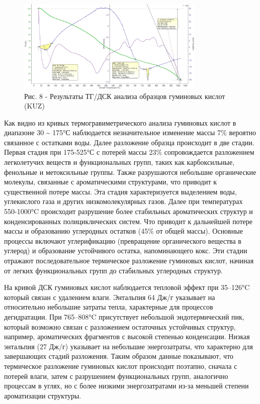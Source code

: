 \begin{figure}[H]
	\centering
	\includegraphics[width=0.8\textwidth]{media/gorn3/image19}
	\caption*{Рис. 8 - Результаты ТГ/ДСК анализа образцов гуминовых кислот (KUZ)}
\end{figure}

\begin{multicols}{2}
Как видно из кривых термогравиметрического анализа гуминовых кислот в
диапазоне 30 \textasciitilde{} 175°С наблюдается незначительное
изменение массы 7\% вероятно связанное с остатками воды. Далее
разложение образца происходит в две стадии. Первая стадия при 175-525°С
с потерей массы 23\% сопровождается разложением легколетучих веществ и
функциональных групп, таких как карбоксильные, фенольные и метоксильные
группы. Также разрушаются небольшие органические молекулы, связанные с
ароматическими структурами, что приводит к существенной потере массы.
Эта стадия характеризуется выделением воды, углекислого газа и других
низкомолекулярных газов. Далее при температурах 550-1000°C происходит
разрушение более стабильных ароматических структур и конденсированных
полициклических систем. Что приводит к дальнейшей потере массы и
образованию углеродных остатков (45\% от общей массы). Основные процессы
включают углерификацию (превращение органического вещества в углерод) и
образование устойчивого остатка, напоминающего кокс. Эти стадии отражают
последовательное термическое разложение гуминовых кислот, начиная от
легких функциональных групп до стабильных углеродных структур.

На кривой ДСК гуминовых кислот наблюдается тепловой эффект при 35--126°C
который связан с удалением влаги. Энтальпия 64 Дж/г указывает на
относительно небольшие затраты тепла, характерные для процессов
дегидратации. При 765--808°C присутствует небольшой эндотермический пик,
который возможно связан с разложением остаточных устойчивых структур,
например, ароматических фрагментов с высокой степенью конденсации.
Низкая энтальпия (27 Дж/г) указывает на небольшие энергозатраты, что
характерно для завершающих стадий разложения. Таким образом данные
показывают, что термическое разложение гуминовых кислот происходит
поэтапно, сначала с потерей влаги, затем с разрушением функциональных
групп, аналогично процессам в углях, но с более низкими энергозатратами
из-за меньшей степени ароматизации структуры.


\end{multicols}
